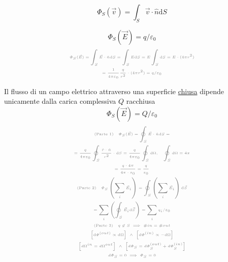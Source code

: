 \begin{multicols}{3}
  \begin{equation}
    \label{eq:flusso}
    \varPhi_S(\vec{v}) = \int_S \vec{v}\cdot\hat{n}\text{d}S
  \end{equation}
  
  \begin{equation}
    \label{eq:flusso-elettrico-semplice}
    \varPhi_S(\vec{E}) = q/\varepsilon_0
  \end{equation}
  \begin{equation*}
    \myproof{
      \begin{gathered}
        \varPhi_S(\vec{E}) =
        \int_S \vec{E}\cdot\hat{n}\text{d}S =
        \int_S E\text{d}S =
        E \int_S \text{d}S =
        E \cdot (4\pi r^2) \\ =
        \frac{1}{4\pi\varepsilon_0}\frac{q}{r^2} \cdot (4\pi r^2) =
        q/\varepsilon_0
      \end{gathered}}
  \end{equation*}

  Il flusso di un campo elettrico attraverso una superficie \underline{chiusa}
  dipende unicamente dalla carica complessiva $Q$ racchiusa
  \begin{equation}
    \label{th:gauss}
    \varPhi_S(\vec{E}) = Q / \varepsilon_0
  \end{equation}
  \begin{equation*}
    \myproof{
      \begin{gathered}
        \text{(Parte 1)} \quad \varPhi_S(\vec{E}) =
        \oint_S \vec{E}\cdot\hat{n}\text{d}S = \\ =
        \frac{q}{4\pi\varepsilon_0} \oint_S \frac{\hat{r}\cdot\hat{n}}{r^2}\cdot\text{d}S =
        \frac{q}{4\pi\varepsilon_0} \oint_S \text{d}\Omega,
        \quad \oint_S \text{d}\Omega = 4\pi\\ =
        \frac{q \cdot 4\pi}{4\pi\cdot\varepsilon_0} = \frac{q}{\varepsilon_0} \\
        \text{(Parte 2)} \quad \varPhi_S\left(\sum_i\vec{E}_i\right) =
        \oint_S \left(\sum_i\vec{E}_i\right)\text{d}\vec{S} \\ =
        \sum_i \left(\oint_S\vec{E}_i\text{d}\vec{S}\right) =
        \sum_i q_i/\varepsilon_0 \\
        \text{(Parte 3)} \quad q \not \in S \implies \#in = \#out\\
        \left[\text{d}\varPhi^{(out)} \propto \text{d}\Omega\right] ~ \wedge ~
        \left[\text{d}\varPhi^{(in)} \propto -\text{d}\Omega\right] \\
        \left[d\Omega^{in} = d\Omega^{out}\right] ~ \wedge ~
        \left[d\varPhi_{S} = d\varPhi_{S}^{(out)} + d\varPhi_{S}^{(in)}\right] \\
        d\varPhi_{S} = 0 \implies \varPhi_{S} = 0
      \end{gathered}
    }
  \end{equation*}

\end{multicols}


